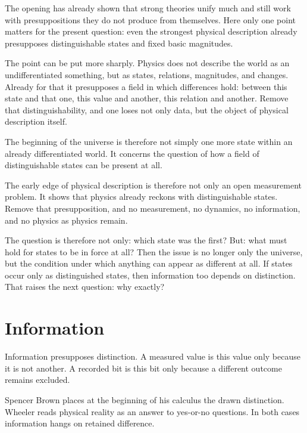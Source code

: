 \documentclass[11pt,a4paper]{book}
\begin{document}
The opening has already shown that strong theories unify much and still work
with presuppositions they do not produce from themselves. Here only one
point matters for the present question: even the strongest physical
description already presupposes distinguishable states and fixed basic
magnitudes.

The point can be put more sharply. Physics does not describe the world as an
undifferentiated something, but as states, relations, magnitudes, and
changes. Already for that it presupposes a field in which differences hold:
between this state and that one, this value and another, this relation and
another. Remove that distinguishability, and one loses not only data, but
the object of physical description itself.

The beginning of the universe is therefore not simply one more state within
an already differentiated world. It concerns the question of how a field of
distinguishable states can be present at all.

The early edge of physical description is therefore not only an open
measurement problem. It shows that physics already reckons with
distinguishable states. Remove that presupposition, and no measurement, no
dynamics, no information, and no physics as physics remain.

The question is therefore not only: which state was the first? But: what
must hold for states to be in force at all? Then the issue is no longer
only the universe, but the condition under which anything can appear as
different at all. If states occur only as distinguished states, then
information too depends on distinction. That raises the next question:
why exactly?

\section{Information}
\label{ch:distinction-information}

Information presupposes distinction. A measured value is this value only
because it is not another. A recorded bit is this bit only because a
different outcome remains excluded.

Spencer Brown places at the beginning of his calculus the drawn
distinction. Wheeler reads physical reality as an answer to yes-or-no
questions. In both cases information hangs on retained difference.
\end{document}
